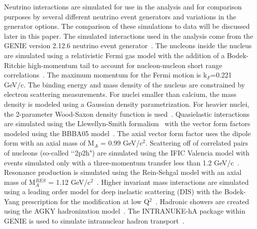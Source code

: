 \documentclass[aps,prd,twocolumn,showpacs,superscriptaddress,floatfix]{revtex4-2}  %
\begin{document}
Neutrino interactions are simulated for use in the analysis and for comparison purposes by several different neutrino event generators and variations in the generator options.  The comparison of these simulations to data will be discussed later in this paper.  The simulated interactions used in the analysis come from the GENIE version 2.12.6 neutrino event generator~\cite{GEANT4:2002zbu}.  The nucleons inside the nucleus are simulated using a relativistic Fermi gas model with the addition of a Bodek-Ritchie high-momentum tail to account for nucleon-nucleon short range correlations~\cite{Bodek:1981wr}.  The maximum momentum for the Fermi motion is k$_{F}$=0.221 GeV/c. The binding energy and mass density of the nucleus are constrained by electron scattering measurements.  For nuclei smaller than calcium, the mass density is modeled using a Gaussian density parametrization.  For heavier nuclei, the 2-parameter Wood-Saxon density function is used~\cite{DeVries:1987atn}.  Quasielastic interactions are simulated using the
Llewellyn-Smith formalism~\cite{LlewellynSmith:1971uhs} with the vector form factors modeled using the BBBA05 model~\cite{Bradford:2006yz}. The axial vector form factor uses the dipole form with an axial mass of M$_{A}$ = 0.99 GeV/c$^{2}$.  Scattering off of correlated pairs of nucleons (so-called \lq\lq 2p2h") are simulated using the IFIC Valencia model with events simulated only with a three-momentum transfer less than 1.2 GeV/c~\cite{Gran:2013kda, Nieves:2011pp}.  Resonance production is simulated using the Rein-Sehgal model with an axial mass of M$_{A}^{RES}$ = 1.12 GeV/c$^{2}$~\cite{Rein:1980wg}. Higher invariant mass interactions are simulated using a leading order model for deep inelastic scattering (DIS) with the Bodek-Yang prescription for the modification at low Q$^{2}$~\cite{Bodek:2004pc}.  Hadronic showers are created using the AGKY hadronization model~\cite{Yang:2009zx}.
The INTRANUKE-hA package within GENIE is used to simulate intranuclear hadron transport~\cite{Dytman:2007zz, *Dytman:2011zz}.  
\end{document}
